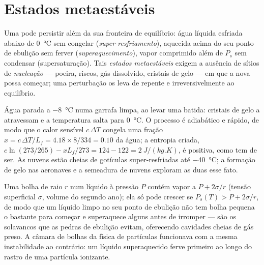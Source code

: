 \section{Estados metaestáveis}

\begin{definition}\label{def:b1:phase-changes:metastable}
Uma  pode persistir além da sua fronteira de equilíbrio: água líquida
esfriada abaixo de \qty{0}{\degreeCelsius} sem congelar (\emph{super-resfriamento}),
aquecida acima do seu ponto de ebulição sem ferver (\emph{superaquecimento}),
vapor comprimido além de $P_s$ sem condensar (supersaturação).
Tais \emph{estados metaestáveis} exigem a ausência de sítios de
\emph{nucleação} --- poeira, riscos, gás dissolvido, cristais de gelo --- em
que a nova  possa começar; uma perturbação os leva de repente e
irreversivelmente ao equilíbrio.
\end{definition}

\begin{example}\label{ex:b1:phase-changes:supercooled}
Água parada a \qty{-8}{\degreeCelsius} numa garrafa limpa, ao levar uma
batida: cristais de gelo a atravessam e a temperatura salta para
\qty{0}{\degreeCelsius}. O processo é adiabático e rápido, de modo que o calor
sensível $c\,\Delta T$ congela uma fração $x = c\,\Delta T/L_f = 4.18 \times 8/334 =
0.10$ da água; a entropia criada, $c\ln(273/265) - xL_f/273 =
124 - 122 = \qty{+2}{J/(kg.K)}$, é positiva, como tem de ser. As nuvens estão
cheias de gotículas super-resfriadas até \qty{-40}{\degreeCelsius}; a formação
de gelo nas aeronaves e a semeadura de nuvens exploram as duas esse fato.
\end{example}

\begin{remark}\label{rem:b1:phase-changes:nucleation}
Uma bolha de raio $r$ num líquido à pressão $P$ contém vapor a
$P + 2\sigma/r$ (tensão superficial $\sigma$, volume do segundo ano); ela só pode
crescer se $P_s(T) > P + 2\sigma/r$, de modo que um líquido limpo no seu ponto
de ebulição não tem bolha pequena o bastante para começar e superaquece
alguns  antes de irromper --- são os solavancos que as pedras de
ebulição evitam, oferecendo cavidades cheias de gás preso. A câmara de
bolhas da física de partículas funcionava com a mesma instabilidade ao
contrário: um líquido superaquecido ferve primeiro ao longo do rastro de uma
partícula ionizante.
\end{remark}

